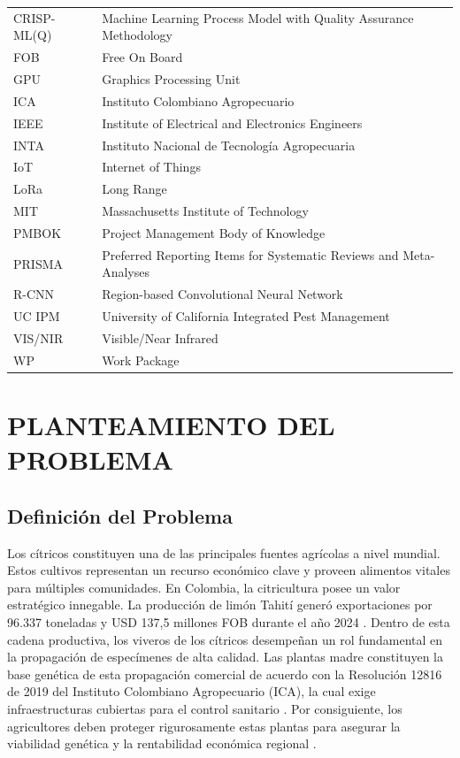\documentclass[12pt,letterpaper]{article}
\begin{document}
\begin{tabular}{@{}p{2.5cm}p{12cm}@{}}
CRISP-ML(Q) & Machine Learning Process Model with Quality Assurance Methodology \\
FOB   & Free On Board  \\
GPU   & Graphics Processing Unit  \\
ICA   & Instituto Colombiano Agropecuario \\
IEEE & Institute of Electrical and Electronics Engineers \\
INTA & Instituto Nacional de Tecnología Agropecuaria \\
IoT & Internet of Things  \\
LoRa & Long Range \\
MIT & Massachusetts Institute of Technology \\
PMBOK & Project Management Body of Knowledge  \\
PRISMA & Preferred Reporting Items for Systematic Reviews and Meta-Analyses \\
R-CNN & Region-based Convolutional Neural Network  \\
UC IPM & University of California Integrated Pest Management \\
VIS/NIR & Visible/Near Infrared \\
WP    & Work Package \\
\end{tabular}

\newpage
\section{PLANTEAMIENTO DEL PROBLEMA}

\subsection{Definición del Problema}

Los cítricos constituyen una de las principales fuentes agrícolas a nivel 
mundial\cite{gill2023citrus}. Estos cultivos representan un recurso económico clave y proveen alimentos vitales para múltiples comunidades. En Colombia, la citricultura posee un valor estratégico innegable. La producción de limón Tahití generó exportaciones por 96.337 toneladas y USD 137,5 millones FOB durante el año 2024 \cite{asohofrucol2024}. Dentro de esta cadena productiva, 
los viveros de los cítricos desempeñan un rol fundamental en la propagación de 
especímenes de alta calidad. Las plantas madre constituyen la base genética de esta propagación comercial de acuerdo con la Resolución 12816 de 2019 del Instituto Colombiano Agropecuario (ICA), la cual exige infraestructuras cubiertas para el control sanitario \cite{ica2019resolucion}. Por consiguiente, los agricultores deben proteger rigurosamente estas plantas para asegurar la viabilidad genética y la rentabilidad económica regional \cite{citrusCenter2012}.
\end{document}
